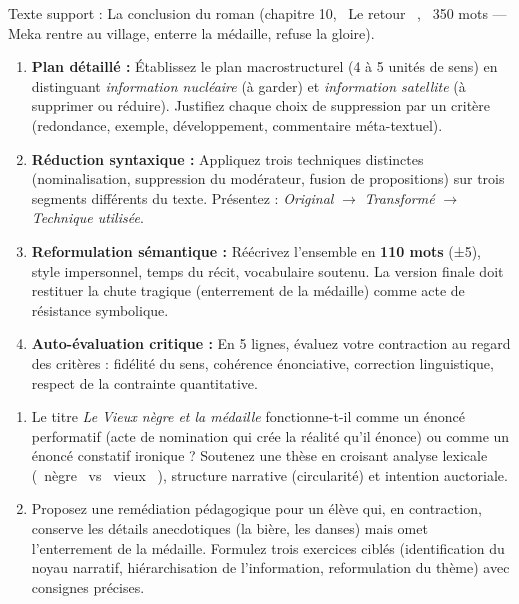 \documentclass[11pt]{article}
\begin{document}
\begin{exercice}
Texte support : La conclusion du roman (chapitre 10, \og~Le retour~ \fg{}, ~350 mots — Meka rentre au village, enterre la médaille, refuse la gloire).
\begin{enumerate}
    \item \textbf{Plan détaillé :} Établissez le plan macrostructurel (4 à 5 unités de sens) en distinguant \textit{information nucléaire} (à garder) et \textit{information satellite} (à supprimer ou réduire). Justifiez chaque choix de suppression par un critère (redondance, exemple, développement, commentaire méta-textuel).
    \item \textbf{Réduction syntaxique :} Appliquez trois techniques distinctes (nominalisation, suppression du modérateur, fusion de propositions) sur trois segments différents du texte. Présentez : \textit{Original} $\rightarrow$ \textit{Transformé} $\rightarrow$ \textit{Technique utilisée}.
    \item \textbf{Reformulation sémantique :} Réécrivez l’ensemble en \textbf{110 mots} (±5), style impersonnel, temps du récit, vocabulaire soutenu. La version finale doit restituer la chute tragique (enterrement de la médaille) comme acte de résistance symbolique.
    \item \textbf{Auto-évaluation critique :} En 5 lignes, évaluez votre contraction au regard des critères : fidélité du sens, cohérence énonciative, correction linguistique, respect de la contrainte quantitative.
\end{enumerate}
\end{exercice}

\begin{exercice}
\begin{enumerate}
    \item Le titre \textit{Le Vieux nègre et la médaille} fonctionne-t-il comme un énoncé performatif (acte de nomination qui crée la réalité qu’il énonce) ou comme un énoncé constatif ironique ? Soutenez une thèse en croisant analyse lexicale (\og~nègre~ \fg{} vs \og~vieux~ \fg{}), structure narrative (circularité) et intention auctoriale.
    \item Proposez une remédiation pédagogique pour un élève qui, en contraction, conserve les détails anecdotiques (la bière, les danses) mais omet l’enterrement de la médaille. Formulez trois exercices ciblés (identification du noyau narratif, hiérarchisation de l’information, reformulation du thème) avec consignes précises.
\end{enumerate}
\end{exercice}
\end{document}
